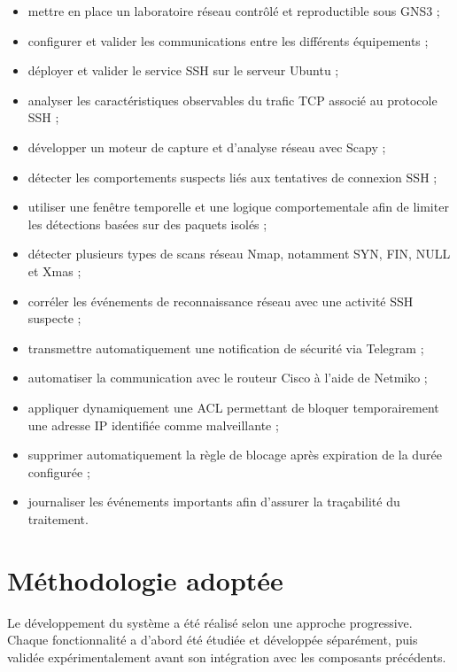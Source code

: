 \begin{itemize}
    \item mettre en place un laboratoire réseau contrôlé et reproductible sous GNS3 \cite{gns3_docs} ;
    \item configurer et valider les communications entre les différents équipements ;
    \item déployer et valider le service SSH sur le serveur Ubuntu ;
    \item analyser les caractéristiques observables du trafic TCP associé au protocole SSH \cite{rfc793,rfc4253} ;
    \item développer un moteur de capture et d’analyse réseau avec Scapy \cite{scapy_docs} ;
    \item détecter les comportements suspects liés aux tentatives de connexion SSH ;
    \item utiliser une fenêtre temporelle et une logique comportementale afin de limiter les détections basées sur des paquets isolés ;
    \item détecter plusieurs types de scans réseau Nmap, notamment SYN, FIN, NULL et Xmas \cite{nmap_reference} ;
    \item corréler les événements de reconnaissance réseau avec une activité SSH suspecte ;
    \item transmettre automatiquement une notification de sécurité via Telegram \cite{telegram_bot_api} ;
    \item automatiser la communication avec le routeur Cisco à l’aide de Netmiko \cite{netmiko_docs} ;
    \item appliquer dynamiquement une ACL permettant de bloquer temporairement une adresse IP identifiée comme malveillante \cite{cisco_ios} ;
    \item supprimer automatiquement la règle de blocage après expiration de la durée configurée ;
    \item journaliser les événements importants afin d’assurer la traçabilité du traitement.
\end{itemize}

\section{Méthodologie adoptée}

Le développement du système a été réalisé selon une approche progressive.
Chaque fonctionnalité a d’abord été étudiée et développée séparément, puis
validée expérimentalement avant son intégration avec les composants précédents.

